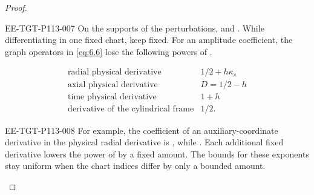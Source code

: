 \begin{proof}
\begin{EESegment}{EE-TGT-P113-007}
On the supports of the perturbations,  and
. While differentiating in one fixed chart, keep
 fixed. For an amplitude coefficient, the graph operators in
\eqref{eq:6.6} lose the following powers of .
\end{EESegment}
\begin{equation}
\begin{array}{r|l}
\text{radial physical derivative} & 1/2+h\kappa_s\\
\text{axial physical derivative} & D=1/2-h\\
\text{time physical derivative} & 1+h\\
\text{derivative of the cylindrical frame} & 1/2.
\end{array}
\tag{9.19}\label{eq:9.19}
\end{equation}
\begin{EESegment}{EE-TGT-P113-008}
For example, the coefficient of an auxiliary-coordinate derivative in the physical radial
derivative is
,
while . Each additional fixed derivative lowers
the power of  by a fixed amount. The bounds for these exponents stay
uniform when the chart indices differ by only a bounded amount.
\end{EESegment}


\end{proof}
